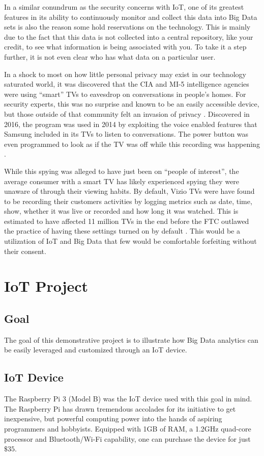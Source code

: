 \documentclass[sigconf]{acmart}
\begin{document}
In a similar conundrum as the security concerns with IoT, one of its greatest features in its ability to continuously monitor and collect this data into Big Data sets is also the reason some hold reservations on the technology. This is mainly due to the fact that this data is not collected into a central repository, like your credit, to see what information is being associated with you. To take it a step further, it is not even clear who has what data on a particular user.

In a shock to most on how little personal privacy may exist in our technology saturated world, it was discovered that the CIA and MI-5 intelligence agencies were using ``smart'' TVs to eavesdrop on conversations in people's homes. For security experts, this was no surprise and known to be an easily accessible device, but those outside of that community felt an invasion of privacy \cite{smarttvdumb}. Discovered in 2016, the program was used in 2014 by exploiting the voice enabled features that Samsung included in its TVs to listen to conversations. The power button was even programmed to look as if the TV was off while this recording was happening \cite{smarttvspy}. 

While this spying was alleged to have just been on ``people of interest'', the average consumer with a smart TV has likely experienced spying they were unaware of through their viewing habits. By default, Vizio TVs were have found to be recording their customers activities by logging metrics such as date, time, show, whether it was live or recorded and how long it was watched. This is estimated to have affected 11 million TVs in the end before the FTC outlawed the practice of having these settings turned on by default \cite{smarttvsettle}. This would be a utilization of IoT and Big Data that few would be comfortable forfeiting without their consent.


\section{IoT Project}
\subsection{Goal}
The goal of this demonstrative project is to illustrate how Big Data analytics can be easily leveraged and customized through an IoT device.  
\subsection{IoT Device}
The Raspberry Pi 3 (Model B) was the IoT device used with this goal in mind. The Raspberry Pi has drawn tremendous accolades for its initiative to get inexpensive, but powerful computing power into the hands of aspiring programmers and hobbyists. Equipped with 1GB of RAM, a 1.2GHz quad-core processor and Bluetooth/Wi-Fi capability, one can purchase the device for just $\$35$. 
\end{document}
